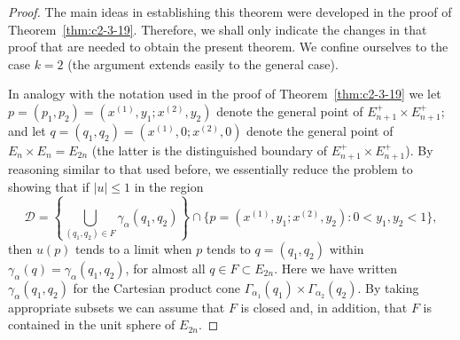 \begin{proof}
The main ideas in establishing this theorem were developed in the proof of Theorem~\ref{thm:c2-3-19}. Therefore, we shall only indicate the changes in that proof that are needed to obtain the present theorem. We confine ourselves to the case $k = 2$ (the argument extends easily to the general case).

In analogy with the notation used in the proof of Theorem~\ref{thm:c2-3-19} we let $p = (p_1, p_2) = (x^{(1)}, y_1; x^{(2)}, y_2)$ denote the general point of $E_{n+1}^+ \times E_{n+1}^+$; and let $q = (q_1, q_2) = (x^{(1)}, 0; x^{(2)}, 0)$ denote the general point of $E_n \times E_n = E_{2n}$ (the latter is the distinguished boundary of $E_{n+1}^+ \times E_{n+1}^+$). By reasoning similar to that used before, we essentially reduce the problem to showing that if $|u| \leq 1$ in the region
\[
\mathcal{D} = \left\{\bigcup_{(q_1,q_2) \in F} \gamma_\alpha(q_1, q_2)\right\} \cap \{p = (x^{(1)}, y_1; x^{(2)}, y_2) : 0 < y_1, y_2 < 1\},
\]
then $u(p)$ tends to a limit when $p$ tends to $q = (q_1, q_2)$ within $\gamma_\alpha(q) = \gamma_\alpha(q_1, q_2)$, for almost all $q \in F \subset E_{2n}$. Here we have written $\gamma_\alpha(q_1, q_2)$ for the Cartesian product cone $\Gamma_{\alpha_1}(q_1) \times \Gamma_{\alpha_2}(q_2)$. By taking appropriate subsets we can assume that $F$ is closed and, in addition, that $F$ is contained in the unit sphere of $E_{2n}$.


\end{proof}
